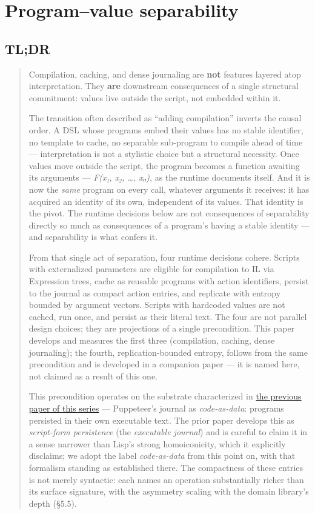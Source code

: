 \documentclass[
]{article}
\begin{document}
\section{Program--value separability}\label{programvalue-separability}

\subsection{TL;DR}\label{tldr}

\begin{quote}
Compilation, caching, and dense journaling are \textbf{not} features
layered atop interpretation. They \textbf{are} downstream consequences
of a single structural commitment: values live outside the script, not
embedded within it.

The transition often described as ``adding compilation'' inverts the
causal order. A DSL whose programs embed their values has no stable
identifier, no template to cache, no separable sub-program to compile
ahead of time --- interpretation is not a stylistic choice but a
structural necessity. Once values move outside the script, the program
becomes a function awaiting its arguments --- \emph{F(x₁, x₂, \ldots,
xₙ)}, as the runtime documents itself. And it is now the \emph{same}
program on every call, whatever arguments it receives: it has acquired
an identity of its own, independent of its values. That identity is the
pivot. The runtime decisions below are not consequences of separability
directly so much as consequences of a program's having a stable identity
--- and separability is what confers it.

From that single act of separation, four runtime decisions cohere.
Scripts with externalized parameters are eligible for compilation to IL
via Expression trees, cache as reusable programs with action
identifiers, persist to the journal as compact action entries, and
replicate with entropy bounded by argument vectors. Scripts with
hardcoded values are not cached, run once, and persist as their literal
text. The four are not parallel design choices; they are projections of
a single precondition. This paper develops and measures the first three
(compilation, caching, dense journaling); the fourth,
replication-bounded entropy, follows from the same precondition and is
developed in a companion paper --- it is named here, not claimed as a
result of this one.

This precondition operates on the substrate characterized in
\href{01-anti-porosity.md}{the previous paper of this series} ---
Puppeteer's journal as \emph{code-as-data}: programs persisted in their
own executable text. The prior paper develops this as \emph{script-form
persistence} (the \emph{executable journal}) and is careful to claim it
in a sense narrower than Lisp's strong homoiconicity, which it
explicitly disclaims; we adopt the label \emph{code-as-data} from this
point on, with that formalism standing as established there. The
compactness of these entries is not merely syntactic: each names an
operation substantially richer than its surface signature, with the
asymmetry scaling with the domain library's depth (§5.5).


\end{quote}
\end{document}
